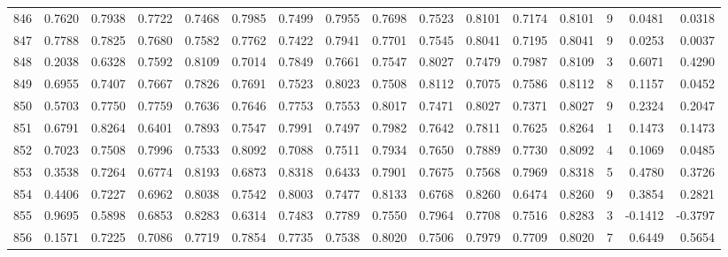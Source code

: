 \begin{tabular}{lrrrrrrrrrrrrrrr}
846 &      0.7620 &  0.7938 &  0.7722 &  0.7468 &  0.7985 &  0.7499 &  0.7955 &  0.7698 &  0.7523 &  0.8101 &   0.7174 &     0.8101 &      9 &                    0.0481 &                     0.0318 \\
847 &      0.7788 &  0.7825 &  0.7680 &  0.7582 &  0.7762 &  0.7422 &  0.7941 &  0.7701 &  0.7545 &  0.8041 &   0.7195 &     0.8041 &      9 &                    0.0253 &                     0.0037 \\
848 &      0.2038 &  0.6328 &  0.7592 &  0.8109 &  0.7014 &  0.7849 &  0.7661 &  0.7547 &  0.8027 &  0.7479 &   0.7987 &     0.8109 &      3 &                    0.6071 &                     0.4290 \\
849 &      0.6955 &  0.7407 &  0.7667 &  0.7826 &  0.7691 &  0.7523 &  0.8023 &  0.7508 &  0.8112 &  0.7075 &   0.7586 &     0.8112 &      8 &                    0.1157 &                     0.0452 \\
850 &      0.5703 &  0.7750 &  0.7759 &  0.7636 &  0.7646 &  0.7753 &  0.7553 &  0.8017 &  0.7471 &  0.8027 &   0.7371 &     0.8027 &      9 &                    0.2324 &                     0.2047 \\
851 &      0.6791 &  0.8264 &  0.6401 &  0.7893 &  0.7547 &  0.7991 &  0.7497 &  0.7982 &  0.7642 &  0.7811 &   0.7625 &     0.8264 &      1 &                    0.1473 &                     0.1473 \\
852 &      0.7023 &  0.7508 &  0.7996 &  0.7533 &  0.8092 &  0.7088 &  0.7511 &  0.7934 &  0.7650 &  0.7889 &   0.7730 &     0.8092 &      4 &                    0.1069 &                     0.0485 \\
853 &      0.3538 &  0.7264 &  0.6774 &  0.8193 &  0.6873 &  0.8318 &  0.6433 &  0.7901 &  0.7675 &  0.7568 &   0.7969 &     0.8318 &      5 &                    0.4780 &                     0.3726 \\
854 &      0.4406 &  0.7227 &  0.6962 &  0.8038 &  0.7542 &  0.8003 &  0.7477 &  0.8133 &  0.6768 &  0.8260 &   0.6474 &     0.8260 &      9 &                    0.3854 &                     0.2821 \\
855 &      0.9695 &  0.5898 &  0.6853 &  0.8283 &  0.6314 &  0.7483 &  0.7789 &  0.7550 &  0.7964 &  0.7708 &   0.7516 &     0.8283 &      3 &                   -0.1412 &                    -0.3797 \\
856 &      0.1571 &  0.7225 &  0.7086 &  0.7719 &  0.7854 &  0.7735 &  0.7538 &  0.8020 &  0.7506 &  0.7979 &   0.7709 &     0.8020 &      7 &                    0.6449 &                     0.5654 \\

\end{tabular}
